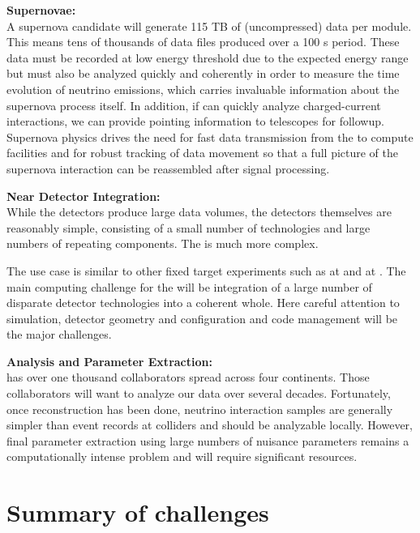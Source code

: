 \documentclass[../main-v1.tex]{subfiles}
\begin{document}
\begin{description}
\item{\bf Supernovae:\\}A supernova candidate will generate 115  TB of (uncompressed) data per module. This means tens of thousands of data files produced over a 100 s period. These data must be recorded at low energy threshold due to the expected energy range but must also be analyzed quickly and coherently in order to measure the time evolution of neutrino emissions, which carries invaluable information about the supernova process itself. In addition, if  can quickly analyze charged-current interactions, we can provide pointing information to telescopes for followup.  Supernova physics drives the need for fast data transmission from the  to compute facilities and for robust tracking of data movement so that a full picture of the supernova interaction can be reassembled after signal processing. 

\item{\bf Near Detector Integration: \\}
While the  detectors produce large data volumes, the detectors themselves are reasonably simple, consisting of a small number of technologies and large numbers of repeating components.  The  is much more complex. 

The  use case is similar to other fixed target experiments such as  at  and  at .  The main computing challenge for the  will be integration of a large number of disparate detector technologies into a coherent whole. Here careful attention to simulation, detector geometry and configuration and code management will be the major challenges. 

\item{\bf Analysis and Parameter Extraction:\\}
 has over one thousand collaborators spread across four continents. Those collaborators will want to analyze our data over several decades. Fortunately, once reconstruction has been done, neutrino interaction samples are generally simpler than event records at colliders and should be analyzable locally.  However, final parameter extraction  using large numbers of nuisance parameters remains a computationally intense problem and will require significant resources. 



\end{description}

\section{Summary of challenges}
\end{document}
